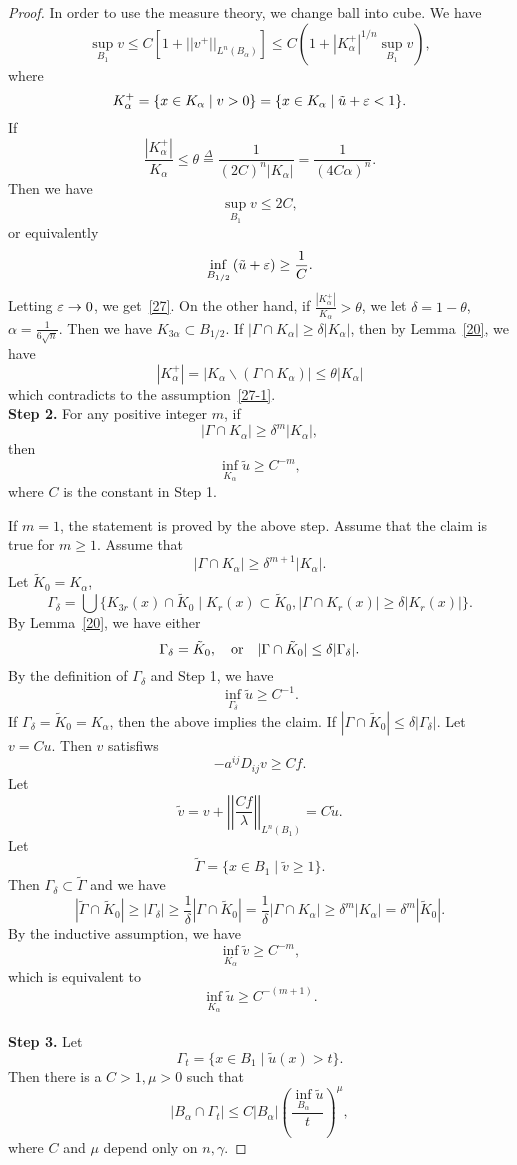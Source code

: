 \begin{proof}
In order to use the measure theory, we change ball into cube. We have 
\[
\sup_{B_1} v\leq C[1+||v^+||_{L^n(B_\alpha)}]\leq C(1+|K_\alpha^+|^{1/n}\sup_{B_1} v),
\]
where 
\[
K_\alpha^+=\{x\in K_\alpha\mid v>0\}=\{x\in K_\alpha\mid\tilde u+\varepsilon<1\}.
\]
If 
\[
\frac{|K_\alpha^+|}{K_\alpha}\leq\theta\overset{\Delta}{=}\frac{1}{(2C)^n|K_\alpha|}=\frac{1}{(4C\alpha)^n}.
\]
Then we have
\[
\sup_{B_1} v\leq 2C,
\]
or equivalently
\[
\inf_{B_{1/2}}\,(\tilde u+\varepsilon)\geq\frac 1C.
\]
Letting 
$\varepsilon\to 0$, we get~\eqref{27}. On the other hand, if $\frac{|K_\alpha^+|}{K_\alpha}>\theta$, we let $\delta=1-\theta$, $\alpha=\frac{1}{6\sqrt n}$. Then we have $K_{3\alpha}\subset B_{1/2}$. If $|\Gamma\cap K_\alpha|\geq\delta|K_\alpha|$, then by Lemma~\ref{20}, we have
\[
|K_\alpha^+|=|K_\alpha\backslash (\Gamma\cap K_\alpha)|\leq\theta|K_\alpha|
\]
which contradicts to the assumption~\eqref{27-1}.\\

{\bf Step 2.} For any positive integer $m$, if
\[
|\Gamma\cap K_\alpha|\geq\delta^m|K_\alpha|,
\]
then
\[
\inf_{K_\alpha}\tilde u\geq C^{-m},
\]
where $C$ is the constant in Step 1.

If $m=1$, the statement is proved  by the above step. Assume that the claim is true for $m\geq 1$. Assume that 
\[
|\Gamma\cap K_\alpha|\geq\delta^{m+1}|K_\alpha|.
\]
Let $\tilde K_0=K_\alpha$,
\[
\Gamma_\delta=\bigcup\{K_{3r}(x)\cap \tilde K_0\mid K_r(x)\subset\tilde K_0, |\Gamma\cap K_r(x)|\geq\delta|K_r(x)|\}.
\]
By Lemma~\ref{20}, we have either 
\[
\Gamma_\delta=\tilde K_0,\quad {\rm or}\quad |\Gamma\cap\tilde K_0|\leq\delta|\Gamma_\delta|.
\]
By the definition of $\Gamma_\delta$ and Step 1, we have
\[
\inf_{\Gamma_\delta}\tilde u\geq C^{-1}.
\]
If $\Gamma_\delta=\tilde K_0=K_\alpha$, then the above implies the claim. If $|\Gamma\cap\tilde K_0|\leq\delta|\Gamma_\delta|$. Let $v=Cu$. Then $v$ satisfiws
\[
-a^{ij}D_{ij} v\geq Cf.
\]
Let
\[
\tilde v=v+\left|\left|\frac{Cf}{\lambda}\right|\right|_{L^n(B_1)}=C\tilde u.
\]
Let
\[
\tilde\Gamma=\{x\in B_1\mid\tilde v\geq 1\}.
\]
Then $\Gamma_\delta\subset\tilde\Gamma$ and we have
\[
|\tilde\Gamma\cap\tilde K_0|\geq|\Gamma_\delta|\geq\frac{1}{\delta}|\Gamma\cap\tilde K_0|
=\frac 1\delta|\Gamma\cap K_\alpha|\geq\delta^m|K_\alpha|=\delta^m|\tilde K_0|.
\]
By the inductive assumption, we have
\[
\inf_{K_\alpha}\tilde v\geq C^{-m},
\]
which is equivalent to 
\[
\inf_{K_\alpha}\tilde u\geq C^{-(m+1)}.
\]\\

{\bf Step 3.} 
Let
\[
\Gamma_t=\{x\in B_1\mid\tilde u(x)>t\}.
\]
Then there is a $C>1, \mu>0$ such that 
\begin{equation}\label{plk}
|B_\alpha\cap \Gamma_t|\leq C|B_\alpha|\left(\frac{\inf_{B_\alpha}\tilde u}{t}\right)^\mu,
\end{equation}
where $C$ and $\mu$ depend only on $n,\gamma$.


\end{proof}
